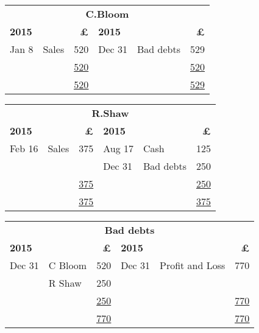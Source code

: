

\noindent
\begin{tabular}{@{}p{2cm}p{4cm}r|p{2cm}p{4cm}r@{}}
\multicolumn{6}{c}{\textbf{C.Bloom}} \\ \addlinespace[1ex]
\toprule
\textbf{2015} & \multicolumn{1}{l}{\textbf{}} & \textbf{£} & \textbf{2015} & \multicolumn{1}{l}{\textbf{}} & \textbf{£} \\
Jan 8 & Sales & 520 & Dec 31 & Bad debts & 529 \\
& & \underline{520} & & & \underline{520} \\
& & \underline{\underline{520}} & & & \underline{\underline{529}} \\

\end{tabular}

\vspace{1.5cm}

\noindent
\begin{tabular}{@{}p{2cm}p{4cm}r|p{2cm}p{4cm}r@{}}
\multicolumn{6}{c}{\textbf{R.Shaw}} \\ \addlinespace[1ex]
\toprule
\textbf{2015} & \multicolumn{1}{l}{\textbf{}} & \textbf{£} & \textbf{2015} & \multicolumn{1}{l}{\textbf{}} & \textbf{£} \\
Feb 16 & Sales & 375 & Aug 17 & Cash & 125 \\
 &  &  & Dec 31 & Bad debts & 250 \\
& & \underline{375} & & & \underline{250} \\
& & \underline{\underline{375}} & & & \underline{\underline{375}} \\

\end{tabular}

\vspace{1.5cm}

\noindent
\begin{tabular}{@{}p{2cm}p{4cm}r|p{2cm}p{4cm}r@{}}
\multicolumn{6}{c}{\textbf{Bad debts}} \\ \addlinespace[1ex]
\toprule
\textbf{2015} & \multicolumn{1}{l}{\textbf{}} & \textbf{£} & \textbf{2015} & \multicolumn{1}{l}{\textbf{}} & \textbf{£} \\
Dec 31 & C Bloom & 520 & Dec 31 & Profit and Loss & 770 \\
 & R Shaw & 250 &  &  &  \\
& & \underline{250} & & & \underline{770} \\
& & \underline{\underline{770}} & & & \underline{\underline{770}} \\

\end{tabular}

\vspace{1.5cm}
